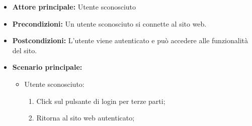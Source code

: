 \label{usecase:Accesso}
\begin{itemize}
	\item \textbf{Attore principale:}  Utente sconosciuto
	\item \textbf{Precondizioni:} Un utente sconosciuto si connette al sito web.
	\item \textbf{Postcondizioni:} L'utente viene autenticato e può accedere alle
	      funzionalità del sito.
	\item \textbf{Scenario principale:}
	      \begin{itemize}
		      \item  Utente sconosciuto:
		            \begin{enumerate}
			            \item Click sul pulsante di login per terze parti;
			            \item Ritorna al sito web autenticato;
		            \end{enumerate}
	      \end{itemize}
\end{itemize}

